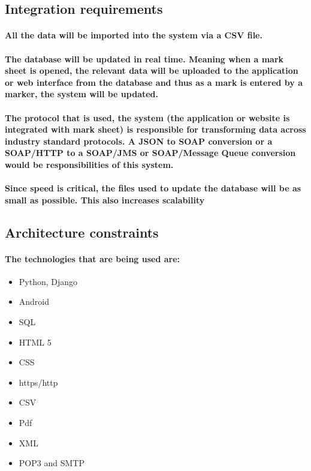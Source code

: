\documentclass[12pt]{article}
\begin{document}
  \subsection{Integration requirements}
  \paragraph{All the data will be imported into the system via a CSV file.}
  \paragraph{The database will be updated in real time. Meaning when a mark sheet is opened, the relevant data will be uploaded to the application or web interface from the database and thus as a mark is entered by a marker, the system will be updated.}
  \paragraph{
  The protocol that is used, the system (the application or website is integrated with mark sheet) is responsible for transforming data across industry standard protocols. A JSON to SOAP conversion or a SOAP/HTTP to a SOAP/JMS or SOAP/Message Queue conversion would be responsibilities of this system. 
  }
  \paragraph{Since speed is critical, the files used to update the database will be as small as possible. This also increases scalability}
  \subsection{Architecture constraints}
  \paragraph{
  The technologies that are being used are:
  }
  \begin{itemize}
  \item Python, Django
  \item Android
  \item SQL
  \item HTML 5
  \item CSS
  \item https/http
  \item CSV
  \item Pdf
  \item XML
  \item POP3 and SMTP
\end{itemize}
\end{document}
